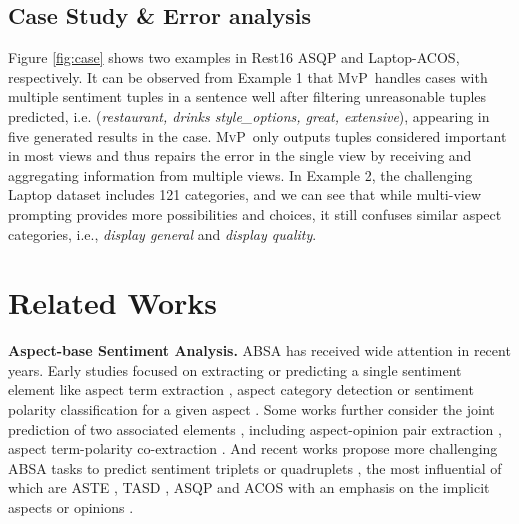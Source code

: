 \documentclass[11pt]{article}
\newcommand\mvp{\textsc{MvP}}
\begin{document}
\subsection{Case Study \& Error analysis}
Figure \ref{fig:case} shows two examples in Rest16 ASQP and Laptop-ACOS, respectively. It can be observed from Example 1 that  \mvp~handles cases with multiple sentiment tuples in a sentence well after filtering unreasonable tuples predicted, i.e. (\textit{restaurant, drinks style\_options, great, extensive}), appearing in five generated results in the case. 
\mvp~only outputs tuples considered important in most views and thus repairs the error in the single view by receiving and aggregating information from multiple views. In Example 2, the challenging Laptop dataset includes 121 categories, and we can see that while multi-view prompting provides more possibilities and choices, it still confuses similar aspect categories, i.e., \textit{display general} and \textit{display quality}.


 
\section{Related Works}





\textbf{Aspect-base Sentiment Analysis.}
ABSA has received wide attention in recent years.
Early studies focused on extracting or predicting a single sentiment element like aspect term extraction \cite{qiu-etal-2011-opinion, liu-etal-2015-fine, ma-etal-2019-exploring}, aspect category detection \cite{DBLP:conf/aaai/ZhouWX15, bu-etal-2021-asap} or sentiment polarity classification for a given aspect \cite{wang-etal-2016-attention, chen-etal-2017-recurrent, lei-etal-2018-multi, DBLP:conf/aaai/LeiYYZG019}.
Some works further consider the joint prediction of two associated elements \cite{cai-etal-2020-aspect}, including aspect-opinion pair extraction \cite{DBLP:conf/aaai/WangPDX17, chen-etal-2020-synchronous}, aspect term-polarity co-extraction \cite{huang-carley-2018-parameterized, luo-etal-2019-doer, chen-qian-2020-relation}. 
And recent works propose more challenging ABSA tasks to predict sentiment triplets or quadruplets \cite{chen-etal-2022-enhanced}, the most influential of which are ASTE \cite{DBLP:conf/aaai/PengXBHLS20, zhai-etal-2022-com}, TASD \cite{DBLP:conf/aaai/WanYDLQP20}, ASQP \cite{zhang-etal-2021-aspect} and ACOS with an emphasis on the implicit aspects or opinions \cite{DBLP:conf/coling/CaiTZYX20}.
\end{document}
